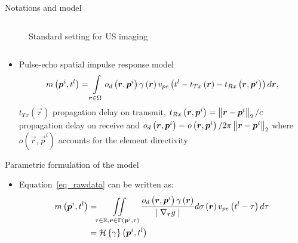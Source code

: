 {\begin{block}{Notations and model}
\begin{columns}
		\begin{column}{.52\textwidth} %
			\centering
			\begin{figure}
				{\footnotesize
				}
				\caption{Standard setting for US imaging}
			\end{figure}
		\end{column}
	\end{columns} %
	
	\begin{itemize}
		\item Pulse-echo spatial impulse response model~\cite{Stepanishen1971}
		\begin{equation}
		\label{eq_rawdata}
		m\left(\bm{p}^i, t^l\right)  = \int \limits_{\bm{r} \in \Omega} o_d \left(\bm{r}, \bm{p}^i\right) \gamma \left(\bm{r}\right) \nonumber v_{pe} \left(t^l - t_{Tx} \left(\bm{r}\right) - t_{Rx} \left( \bm{r}, \bm{p}^i \right) \right)  d\bm{r},
		\end{equation} 
		$t_{Tx} \left(\vec{r}\right)$ propagation delay on transmit, $t_{Rx} \left( \bm{r}, \bm{p}^i  \right) = \left\lVert\bm{r} - \bm{p}^i\right\rVert_{2} / c$ propagation delay on receive and $o_d \left(\bm{r}, \bm{p}^i\right) = o \left(\bm{r}, \bm{p}^i\right) / 2 \pi \left\lVert\bm{r} - \bm{p}^i\right\rVert_{2}$ where $o \left(\vec{r}, \vec{p}^i\right)$ accounts for the element directivity~\cite{Selfridge1980}
	\end{itemize}
\end{block}
\vfill 
\begin{block}{Parametric formulation of the model}
\begin{itemize}
	\item Equation~\eqref{eq_rawdata} can be written as:
	\begin{align}
	\label{eq_inv_problem_cont_domain}
	m\left(\vec{p}^i, t^l\right) &= \iint \limits_{ \tau \in \R, \vec{r} \in \Gamma\left(\vec{p}^i, \tau\right)} \frac{o_d\left(\vec{r}, \vec{p}^i\right)\reflectivity \left(\vec{r}\right)}{\mid \nabla_{\vec{r}} g \mid} d \sigma \left(\vec{r}\right) v_{pe} \left(t^l - \tau\right) d \tau \nonumber \\
	&= \mathcal{H}\left\lbrace \reflectivity\right\rbrace \left(\vec{p}^i, t^l\right) 

\end{align}
\end{itemize}
\end{block}}
